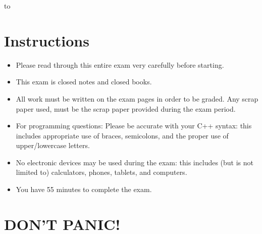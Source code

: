 \documentclass[11pt,answers]{exam}
\begin{document}
\begin{center} 
\end{center}

\lstset{language=C++,numbers=left, numberstyle=\tiny, stepnumber=1, numbersep=5pt, showstringspaces=true}

\vspace{0.1in} 
\hbox to \textwidth{Name:\enspace\hrulefill}

\section*{Instructions}
\begin{itemize}
\item Please read through this entire exam very carefully before starting. 
\item This exam is closed notes and closed books.
\item All work must be written on the exam pages in order to be graded. Any scrap paper used, must be the scrap paper provided during the exam period.
\item For programming questions: Please be accurate with your C++ syntax: this includes appropriate use of braces, semicolons, and the proper use of upper/lowercase letters.  
\item No electronic devices may be used during the exam: this includes (but is not limited to) calculators, phones, tablets, and computers.
\item You have 55 minutes to complete the exam.  
\end{itemize}

\section*{DON'T PANIC!}

\begin{center} 
  \gradetable[h]
\end{center}
\newpage
\end{document}
